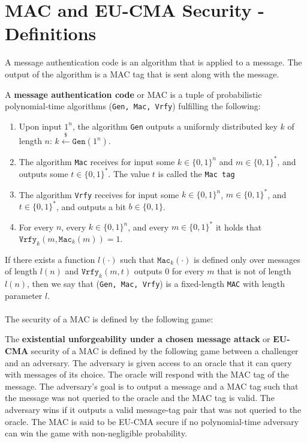\documentclass{article}
\begin{document}
\section{MAC and EU-CMA Security - Definitions}
A message authentication code is an algorithm that is applied to a message. The output of the algorithm is a MAC tag that is sent along with the message.
\begin{definition}
A \textbf{message authentication code} or MAC is a tuple of probabilistic polynomial-time algorithms (\texttt{Gen, Mac, Vrfy}) fulfilling the following: \\
\begin{enumerate}
    \item Upon input $1^n$, the algorithm \texttt{Gen} outputs a uniformly distributed key $k$ of length $n$: $k \xleftarrow{\$} \texttt{Gen}(1^n)$.
    \item The algorithm \texttt{Mac} receives for input some $k \in \{0,1\}^n$ and $m \in \{0,1\}^*$, and outputs some $t \in \{0,1\}^*$. The value $t$ is called the \texttt{Mac tag}
    \item The algorithm \texttt{Vrfy} receives for input some $k \in \{0,1\}^n$, $m \in \{0,1\}^*$, and $t \in \{0,1\}^*$, and outputs a bit $b \in \{0,1\}$. 
    \item For every $n$, every $k \in \{0,1\}^n$, and every $m \in \{0,1\}^*$ it holds that $\texttt{Vrfy}_k(m,\texttt{Mac}_k(m)) = 1$.
\end{enumerate}
\end{definition}
If there exists a function $l(\cdot)$ such that $\texttt{Mac}_k(\cdot)$ is defined only over messages of length $l(n)$ and $\texttt{Vrfy}_k(m,t)$ outputs 0 for every $m$ that is not of length $l(n)$, then we say that (\texttt{Gen, Mac, Vrfy}) is a fixed-length \texttt{MAC} with length parameter $l$. \\ \\
The security of a MAC is defined by the following game:
\begin{definition}
The \textbf{existential unforgeability under a chosen message attack} or \textbf{EU-CMA} security of a MAC is defined by the following game between a challenger and an adversary. The adversary is given access to an oracle that it can query with messages of its choice. The oracle will respond with the MAC tag of the message. The adversary's goal is to output a message and a MAC tag such that the message was not queried to the oracle and the MAC tag is valid. The adversary wins if it outputs a valid message-tag pair that was not queried to the oracle. The MAC is said to be EU-CMA secure if no polynomial-time adversary can win the game with non-negligible probability.
\end{definition}
\end{document}
